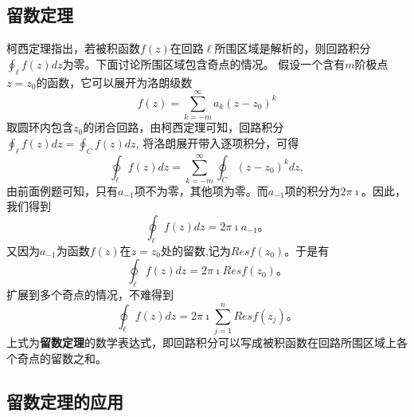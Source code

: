 \subsection{留数定理}
\label{subsec:residual_theorem}
柯西定理指出，若被积函数$f(z)$在回路$\ell$所围区域是解析的，则回路积分$\oint_\ell f(z) dz$为零。下面讨论所围区域包含奇点的情况。
假设一个含有$m$阶极点$z=z_0$的函数，它可以展开为洛朗级数
\[
  f(z) = \sum_{k = -m} ^{\infty} a_k (z - z_0)^k  
\]
取圆环内包含$z_0$的闭合回路，由柯西定理可知，回路积分$\oint_\ell f(z) dz = \oint_C f(z) dz$, 将洛朗展开带入逐项积分，可得
\[
\oint_\ell f(z) dz = \sum_{k = -m} ^{\infty} \oint_C  (z - z_0)^k dz,
\]
由前面例题可知，只有$a_{-1}$项不为零，其他项为零。而$a_{-1}$项的积分为$2\pi\imath$。因此，我们得到
\begin{equation}
    \oint_\ell f(z) dz = 2\pi \imath a_{-1} \textrm{。}
\end{equation}
又因为$a_{-1}$为函数$f(z)$在$z=z_0$处的留数,记为$Res f(z_0)$。于是有
\begin{equation}
    \oint_\ell f(z) dz = 2\pi \imath Res f(z_0) \textrm{。}
\end{equation}
扩展到多个奇点的情况，不难得到
\begin{equation}
    \oint_\ell f(z) dz = 2\pi \imath \sum_{j=1}^{n} Res f(z_j) \textrm{。}
\end{equation}
上式为\textbf{留数定理}的数学表达式，即回路积分可以写成被积函数在回路所围区域上各个奇点的留数之和。


\subsection{留数定理的应用}
\label{subsec:residual_theorem_applications}